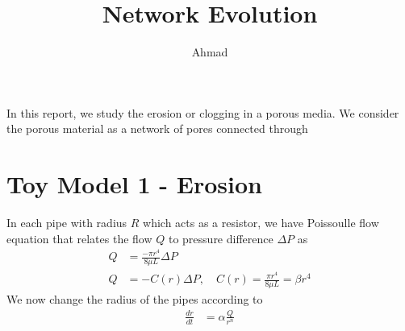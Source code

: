 
\def\d{\text{d}}
\def\vep{\varepsilon}
\def\ep{\epsilon}
\def\la{\langle}
\def\ra{\rangle}
\def\th{\theta}
\usepackage{tikz}
\usepackage{circuitikz}

\title{Network Evolution}
\author{Ahmad}
          
\maketitle

In this report, we study the erosion or clogging in a porous media. We consider the porous material as a network of pores connected through  


\section{Toy Model 1 - Erosion }
%
In each pipe with radius $R$ which acts as a resistor, we have
Poissoulle flow equation that relates the flow $Q$ to pressure
difference $\Delta P$ as
%
\begin{align}
  Q & = \frac{-\pi r^{4}}{8\mu L}  \Delta P\\
  Q & = -C(r) \Delta P, \quad C (r) = \frac{\pi r^{4}}{8\mu L} = {\beta}{r^{4}} 
\end{align}
%
We now change the radius of the pipes according to
%
\begin{align}
  \frac{d r}{dt} & = \alpha \frac{Q}{r^{n}} 
\end{align}
%

